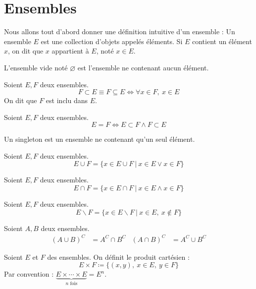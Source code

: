 \chapter{Ensembles}
Nous allons tout d'abord donner une définition intuitive d'un ensemble : Un ensemble $E$ est une collection d'objets appelés éléments. Si $E$ contient un élément $x$, on dit que $x$ appartient à $E$, noté $x \in E$.

\begin{definition}
  L'ensemble vide noté $\varnothing$ est l'ensemble ne contenant aucun élément.
\end{definition}

\begin{definition}[Inclusion]
  Soient $E, F$ deux ensembles.
  $$F \subset E \equiv F \subseteq E \iff \forall x \in F,\ x \in E$$
  On dit que $F$ est inclu dans $E$.
\end{definition}

\begin{definition}
  Soient $E, F$ deux ensembles.
  $$E = F \iff E \subset F \land F \subset E$$
\end{definition}

\begin{definition}[Singleton]
  Un singleton est un ensemble ne contenant qu'un seul élément.
\end{definition}

\begin{definition}
  Soient $E, F$ deux ensembles.
  \[ E \cup F = \{ x \in E \cup F \ | \ x \in E \lor x \in F \} \]
\end{definition}

\begin{definition}
  Soient $E, F$ deux ensembles.
  \[ E \cap F = \{ x \in E \cap F \ | \ x \in E \land x \in F \} \]
\end{definition}

\begin{definition}
  Soient $E, F$ deux ensembles.
  \[ E \backslash F = \{ x \in E \backslash F \ | \ x \in E,\ x \notin F \} \]
\end{definition}

\begin{proposition}
  Soient $A, B$ deux ensembles.
  \begin{align*}
    (A \cup B)^{C} &= A^{C} \cap B^{C} & (A \cap B)^{C} &= A^{C} \cup B^{C}
  \end{align*}
\end{proposition}

\begin{definition}
    Soient $E$ et $F$ des ensembles. On définit le produit cartésien :
    \[ E \times F \coloneqq \{ (x, y),\ x \in E,\ y \in F \} \]
    Par convention : $\underbrace{E \times \cdots \times E}_{n \text{ fois}} = E^n$.
\end{definition}
